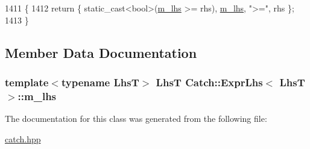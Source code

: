 \begin{DoxyCode}
1411                                                                                   \{
1412             \textcolor{keywordflow}{return} \{ \textcolor{keyword}{static\_cast<}\textcolor{keywordtype}{bool}\textcolor{keyword}{>}(\hyperlink{class_catch_1_1_expr_lhs_af290873a8427ccbdae6acb915fb7366a}{m\_lhs} >= rhs), \hyperlink{class_catch_1_1_expr_lhs_af290873a8427ccbdae6acb915fb7366a}{m\_lhs}, \textcolor{stringliteral}{">="}, rhs \};
1413         \}
\end{DoxyCode}


\subsection{Member Data Documentation}
\hypertarget{class_catch_1_1_expr_lhs_af290873a8427ccbdae6acb915fb7366a}{
\subsubsection[{m\-\_\-lhs}]{\setlength{\rightskip}{0pt plus 5cm}template$<$typename Lhs\-T$>$ Lhs\-T {\bf Catch\-::\-Expr\-Lhs}$<$ Lhs\-T $>$\-::m\-\_\-lhs\hspace{0.3cm}{\ttfamily [private]}}}\label{class_catch_1_1_expr_lhs_af290873a8427ccbdae6acb915fb7366a}


The documentation for this class was generated from the following file\-:\begin{DoxyCompactItemize}
\item 
\hyperlink{catch_8hpp}{catch.\-hpp}\end{DoxyCompactItemize}
